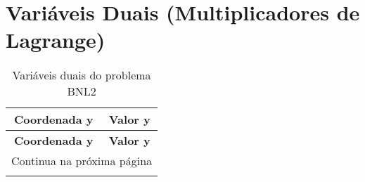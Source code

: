 \documentclass[12pt]{article}
\begin{document}
\section{Variáveis Duais (Multiplicadores de Lagrange)}

\begin{longtable}{@{}cc@{}}
\caption{Variáveis duais do problema BNL2} \\
\toprule
\textbf{Coordenada y} & \textbf{Valor y} \\
\midrule
\endfirsthead

\toprule
\textbf{Coordenada y} & \textbf{Valor y} \\
\midrule
\endhead

\midrule \multicolumn{2}{r}{{Continua na próxima página}} \\ \midrule
\endfoot


\end{longtable}
\end{document}
